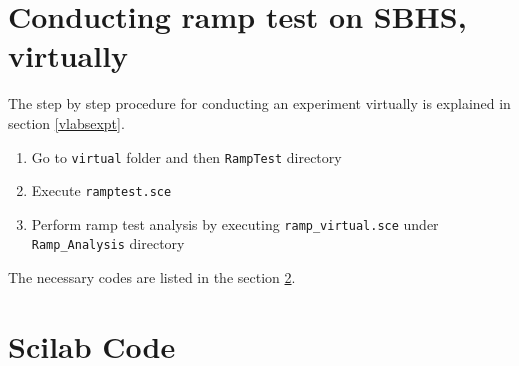 \section{Conducting ramp test on SBHS, virtually}
The step by step procedure for conducting an experiment virtually is explained in section \ref{vlabsexpt}. 
\begin{enumerate}
 \item Go to {\tt virtual} folder and then {\tt RampTest} directory
 \item Execute {\tt ramptest.sce}
 \item Perform ramp test analysis by executing {\tt ramp\_virtual.sce} under {\tt Ramp\_Analysis} directory
\end{enumerate}

The necessary codes are listed in the section \ref{rampcodes}.

\section{Scilab Code}\label{rampcodes}
\begin{code}

\end{code}

\begin{code}

\end{code}

\begin{code}

\end{code}

\begin{code}

\end{code}

\begin{code}

\end{code}

\begin{code}

\end{code}

\begin{code}

\end{code}


